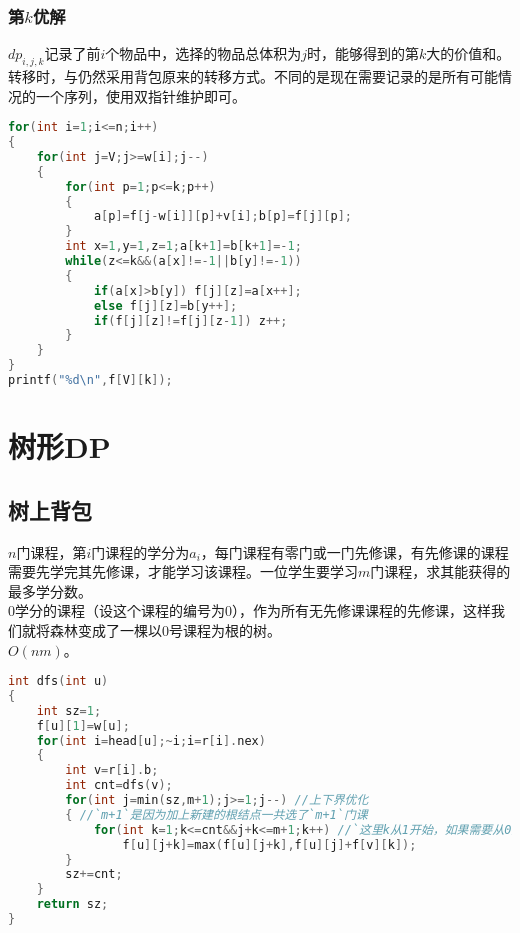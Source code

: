 \documentclass[a4paper]{book}
\begin{document}
\subsubsection{第$k$优解}
$dp_{i,j,k}$记录了前$i$个物品中，选择的物品总体积为$j$时，能够得到的第$k$大的价值和。转移时，与仍然采用背包原来的转移方式。不同的是现在需要记录的是所有可能情况的一个序列，使用双指针维护即可。
\begin{lstlisting}[language=c++]
for(int i=1;i<=n;i++)
{
    for(int j=V;j>=w[i];j--)
    {
        for(int p=1;p<=k;p++)
        {
            a[p]=f[j-w[i]][p]+v[i];b[p]=f[j][p];
        }
        int x=1,y=1,z=1;a[k+1]=b[k+1]=-1;
        while(z<=k&&(a[x]!=-1||b[y]!=-1)) 
        {
            if(a[x]>b[y]) f[j][z]=a[x++];
            else f[j][z]=b[y++];
            if(f[j][z]!=f[j][z-1]) z++;
        }
    }
}
printf("%d\n",f[V][k]);
\end{lstlisting}

\section{树形DP}
\subsection*{树上背包}
$n$门课程，第$i$门课程的学分为$a_i$，每门课程有零门或一门先修课，有先修课的课程需要先学完其先修课，才能学习该课程。一位学生要学习$m$门课程，求其能获得的最多学分数。\\
$0$学分的课程（设这个课程的编号为$0$），作为所有无先修课课程的先修课，这样我们就将森林变成了一棵以$0$号课程为根的树。\\
$O(nm)$。
\begin{lstlisting}[language=c++,escapeinside=``]
int dfs(int u)
{
    int sz=1;
    f[u][1]=w[u];
    for(int i=head[u];~i;i=r[i].nex)
    {
        int v=r[i].b;
        int cnt=dfs(v);
        for(int j=min(sz,m+1);j>=1;j--) //上下界优化
        { //`m+1`是因为加上新建的根结点一共选了`m+1`门课
            for(int k=1;k<=cnt&&j+k<=m+1;k++) //`这里k从1开始，如果需要从0则最后处理`
                f[u][j+k]=max(f[u][j+k],f[u][j]+f[v][k]);
        }
        sz+=cnt;
    }
    return sz;
}
\end{lstlisting}
\end{document}
